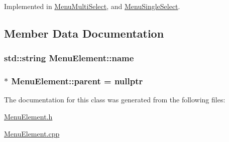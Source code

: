 Implemented in \hyperlink{classMenuMultiSelect_a1f38785618e99e3644b5903811748be1}{Menu\+Multi\+Select}, and \hyperlink{classMenuSingleSelect_a1fdb45b9443e2e715665205cb383432b}{Menu\+Single\+Select}.



\subsection{Member Data Documentation}
\hypertarget{classMenuElement_ad7a280435eda4d231a68ae8645e7d98e}{}
\subsubsection[{name}]{\setlength{\rightskip}{0pt plus 5cm}std\+::string Menu\+Element\+::name\hspace{0.3cm}{\ttfamily [private]}}\label{classMenuElement_ad7a280435eda4d231a68ae8645e7d98e}
\hypertarget{classMenuElement_a460f4e15826520bea44df1ef78f2b18f}{}
\subsubsection[{parent}]{$\ast$ Menu\+Element\+::parent = nullptr\hspace{0.3cm}{\ttfamily [protected]}}\label{classMenuElement_a460f4e15826520bea44df1ef78f2b18f}


The documentation for this class was generated from the following files\+:\begin{DoxyCompactItemize}
\item 
\hyperlink{MenuElement_8h}{Menu\+Element.\+h}\item 
\hyperlink{MenuElement_8cpp}{Menu\+Element.\+cpp}\end{DoxyCompactItemize}
